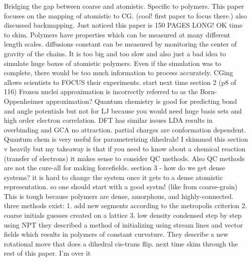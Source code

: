 \documentclass{article}
\begin{document}
Bridging the gap between coarse and atomistic. Specific to polymers. This paper focuses on the mapping of atomistic to CG. (cool! first paper to focus there.) also discussed backmapping. Just noticed this paper is 150 PAGES LONG! OK time to skim.
Polymers have properties which can be measured at many different length scales. diffusions constant can be measured by monitoring the center of gravity of the chains.
It is too big and too slow and also just a bad idea to simulate huge boxes of atomistic polymers. Even if the simulation was to complete, there would be too much information to process accurately. CGing allows scientists to FOCUS their experiments.
start next time section 2 (p8 of 116)
Frozen nuclei approximation is incorrectly referred to as the Born-Oppenheimer approximation?
Quantum chemistry is good for predicting bond and angle potentials but not for LJ because you would need huge basis sets and high order electron correlation. DFT has similar issues LDA results in overbinding and GCA no attraction. partial charges are conformation dependent. 
Quantum chem is very useful for parameterizing dihedrals!
I skimmed this section v heavily but my takeaway is that if you need to know about a chemical reaction (transfer of electrons) it makes sense to consider QC methods. Also QC methods are not the cure-all for making forcefields.
section 3 - how do we get dense systems?
it is hard to change the system once it gets to a dense atomistic representation. so one should start with a good systm! (like from coarse-grain)
This is tough because polymers are dense, amorphous, and highly-connected. three methods exist:
1. add new segments according to the metropolis criterion
2. coarse initials guesses created on a lattice
3. low density condensed step by step using NPT
they described a method of initializing using stream lines and vector fields which results in polymers of constant curvature.
They describe a new rotational move that does a dihedral cis-trans flip.
next time skim through the rest of this paper. I'm over it
\cite{Brini2013}
\cite{Murtola2009a}
\cite{Peter2009d}

\cite{Kim2006}
\cite{Lee2011}
\cite{Huang2010}
\cite{Jankowski2013}
\cite{Marsh2014}



\end{document}
